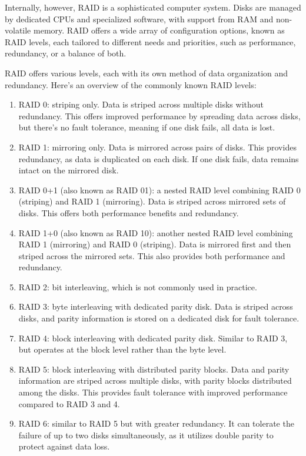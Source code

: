Internally, however, RAID is a sophisticated computer system. 
Disks are managed by dedicated CPUs and specialized software, with support from RAM and non-volatile memory. 
RAID offers a wide array of configuration options, known as RAID levels, each tailored to different needs and priorities, such as performance, redundancy, or a balance of both.

RAID offers various levels, each with its own method of data organization and redundancy. 
Here's an overview of the commonly known RAID levels:
\begin{enumerate}
    \item RAID 0: striping only. 
        Data is striped across multiple disks without redundancy. 
        This offers improved performance by spreading data across disks, but there's no fault tolerance, meaning if one disk fails, all data is lost.
    \item RAID 1: mirroring only. 
        Data is mirrored across pairs of disks. 
        This provides redundancy, as data is duplicated on each disk. 
        If one disk fails, data remains intact on the mirrored disk.
    \item RAID 0+1 (also known as RAID 01): a nested RAID level combining RAID 0 (striping) and RAID 1 (mirroring). 
        Data is striped across mirrored sets of disks. 
        This offers both performance benefits and redundancy.
    \item RAID 1+0 (also known as RAID 10): another nested RAID level combining RAID 1 (mirroring) and RAID 0 (striping). 
        Data is mirrored first and then striped across the mirrored sets. 
        This also provides both performance and redundancy.
    \item RAID 2: bit interleaving, which is not commonly used in practice.
    \item RAID 3: byte interleaving with dedicated parity disk. 
        Data is striped across disks, and parity information is stored on a dedicated disk for fault tolerance.
    \item RAID 4: block interleaving with dedicated parity disk. 
        Similar to RAID 3, but operates at the block level rather than the byte level.
    \item RAID 5: block interleaving with distributed parity blocks. 
        Data and parity information are striped across multiple disks, with parity blocks distributed among the disks. 
        This provides fault tolerance with improved performance compared to RAID 3 and 4.
    \item RAID 6: similar to RAID 5 but with greater redundancy. 
        It can tolerate the failure of up to two disks simultaneously, as it utilizes double parity to protect against data loss.
\end{enumerate}




